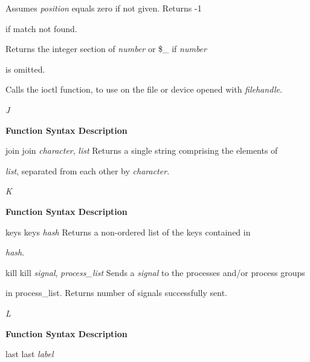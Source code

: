 \documentclass[a4paper,11pt]{book}
\begin{document}
\noindent Assumes \textit{position }equals zero if not given. Returns -1

\noindent if match not found.

\noindent 

\noindent Returns the integer section of \textit{number }or \$\_ if \textit{number}

\noindent is omitted.

\noindent 

\noindent Calls the ioctl function, to use on the file or device opened with \textit{filehandle}.

\noindent 

\noindent 

\noindent \textit{J}

\noindent 

\noindent \textbf{Function Syntax Description}

\noindent 

\noindent join join \textit{character}, \textit{list }Returns a single string comprising the elements of

\noindent \textit{list}, separated from each other by \textit{character.}

\noindent 

\noindent 

\noindent \textit{K}

\noindent 

\noindent \textbf{Function Syntax Description}

\noindent 

\noindent keys keys \textit{hash }Returns a non-ordered list of the keys contained in

\noindent \textit{hash}.

\noindent 

\noindent kill kill \textit{signal}, \textit{process\_list }Sends a \textit{signal }to the processes and/or process groups

\noindent in process\_list. Returns number of signals successfully sent.

\noindent 

\noindent 

\noindent \textit{L}

\noindent 

\noindent \textbf{Function Syntax Description}

\noindent 

\noindent last last \textit{label}

\noindent 
\end{document}
